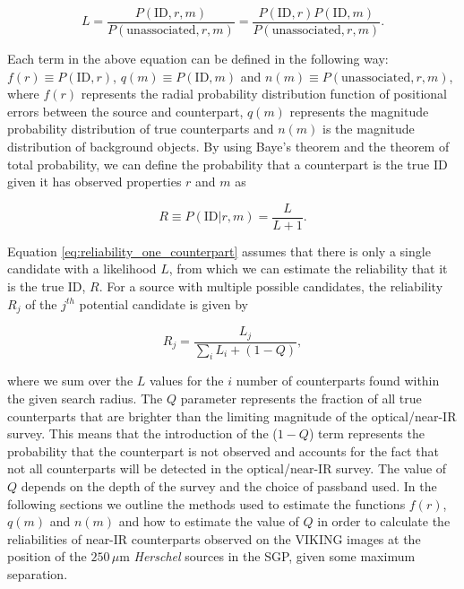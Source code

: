 \begin{equation}
\label{eq:likelihood_ratio}
    L = \frac{P(\textrm{ID}, r, m)}{P(\textrm{unassociated}, r, m)} = \frac{P(\textrm{ID}, r) P(\textrm{ID}, m)}{P(\textrm{unassociated}, r, m)}.
\end{equation}

Each term in the above equation can be defined in the following way: $f(r) \equiv P(\textrm{ID}, r)$, $q(m) \equiv P(\textrm{ID}, m)$ and $n(m) \equiv P(\textrm{unassociated}, r, m)$, where $f(r)$ represents the radial probability distribution function of positional errors between the source and counterpart, $q(m)$ represents the magnitude probability distribution of true counterparts and $n(m)$ is the magnitude distribution of background objects. By using Baye's theorem and the theorem of total probability, we can define the probability that a counterpart is the true ID given it has observed properties $r$ and $m$ as

\begin{equation}
\label{eq:reliability_one_counterpart}
    R \equiv P(\textrm{ID}| r, m) = \frac{L}{L+1}.
\end{equation}

Equation \ref{eq:reliability_one_counterpart} assumes that there is only a single candidate with a likelihood $L$, from which we can estimate the reliability that it is the true ID, $R$. For a source with multiple possible candidates, the reliability $R_j$ of the $j^{th}$ potential candidate is given by

\begin{equation}
    \label{eq:reliability_multiple_counterparts}
        R_j = \frac{L_j}{\sum_i L_i + (1-Q)},
\end{equation}

\noindent where we sum over the $L$ values for the $i$ number of counterparts found within the given search radius. The $Q$ parameter represents the fraction of all true counterparts that are brighter than the limiting magnitude of the optical/near-IR survey. This means that the introduction of the ($1 - Q$) term represents the probability that the counterpart is not observed and accounts for the fact that not all counterparts will be detected in the optical/near-IR survey. The value of $Q$ depends on the depth of the survey and the choice of passband used. In the following sections we outline the methods used to estimate the functions $f(r)$, $q(m)$ and $n(m)$ and how to estimate the value of $Q$ in order to calculate the reliabilities of near-IR counterparts observed on the VIKING images at the position of the $250\,\mu$m \textit{Herschel} sources in the SGP, given some maximum separation.

